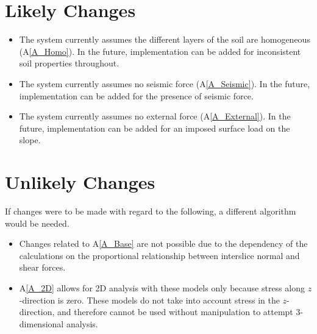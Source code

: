 \documentclass[12pt]{article}
\newcommand{\aref}[1]{A\ref{#1}}
\newcounter{lcnum} %
\newcommand{\lthelcnum}{LC\thelcnum}
\newcounter{ucnum} %
\newcommand{\ltheucnum}{UC\theucnum}
\begin{document}
\section{Likely Changes}

\noindent \begin{itemize}
\item[\refstepcounter{lcnum}\lthelcnum \label{LC_inhomogeneous}:] The system 
currently assumes the different layers of the soil are homogeneous 
(\aref{A_Homo}). In the future, implementation can be added for inconsistent 
soil properties throughout.
 
\item[\refstepcounter{lcnum}\lthelcnum \label{LC_Seismic}:] The system 
currently assumes no seismic force (\aref{A_Seismic}). In the future, 
implementation can be added for the presence of seismic force.

\item[\refstepcounter{lcnum}\lthelcnum \label{LC_External}:] The system 
currently assumes no external force (\aref{A_External}).
In the future, implementation can be added for an imposed surface load on the 
slope.
\end{itemize}

\section{Unlikely Changes}
If changes were to be made with regard to the following,
a different algorithm would be needed.

\begin{itemize}
\item[\refstepcounter{ucnum}\ltheucnum \label{UC_insf}:] Changes related to 
\aref{A_Base} are not possible due to the dependency of the calculations on the 
proportional relationship between interslice normal and shear forces.
\item[\refstepcounter{ucnum}\ltheucnum \label{UC_inhomogeneous}:] \aref{A_2D} 
allows for 2D analysis with these models only because stress along 
$z$-direction is zero. These models do not take into account stress in the 
$z$-direction, and therefore cannot be used without manipulation to attempt 
3-dimensional analysis.
\end{itemize}


\end{document}
